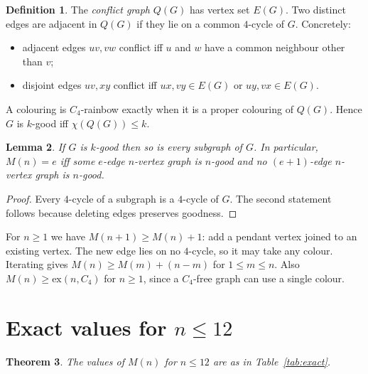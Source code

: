 \documentclass[11pt]{amsart}
\newtheorem{theorem}{Theorem}
\newtheorem{lemma}[theorem]{Lemma}
\theoremstyle{definition}
\newtheorem{definition}[theorem]{Definition}
\newcommand{\M}{M}
\begin{document}
\begin{definition}
The \emph{conflict graph} $Q(G)$ has vertex set $E(G)$. Two distinct edges are adjacent in
$Q(G)$ if they lie on a common $4$-cycle of $G$. Concretely:
\begin{itemize}
\item adjacent edges $uv,vw$ conflict iff $u$ and $w$ have a common neighbour other than $v$;
\item disjoint edges $uv,xy$ conflict iff $ux,vy\in E(G)$ or $uy,vx\in E(G)$.
\end{itemize}
\end{definition}

A colouring is $C_4$-rainbow exactly when it is a proper colouring of $Q(G)$. Hence $G$ is
$k$-good iff $\chi(Q(G))\le k$.

\begin{lemma}\label{lem:hered}
If $G$ is $k$-good then so is every subgraph of $G$.
In particular, $\M(n)=e$ iff some $e$-edge $n$-vertex graph is $n$-good and no
$(e+1)$-edge $n$-vertex graph is $n$-good.
\end{lemma}

\begin{proof}
Every $4$-cycle of a subgraph is a $4$-cycle of $G$. The second statement follows because
deleting edges preserves goodness.
\end{proof}

For $n\ge1$ we have $\M(n+1)\ge \M(n)+1$: add a pendant vertex joined to an existing vertex.
The new edge lies on no $4$-cycle, so it may take any colour. Iterating gives
$\M(n)\ge\M(m)+(n-m)$ for $1\le m\le n$. Also $\M(n)\ge \mathrm{ex}(n,C_4)$ for $n\ge1$, since
a $C_4$-free graph can use a single colour.

\section{Exact values for $n\le12$}

\begin{theorem}\label{thm:exact}
The values of $\M(n)$ for $n\le 12$ are as in Table~\ref{tab:exact}.
\end{theorem}
\end{document}
